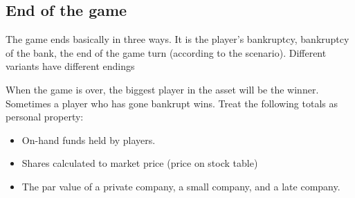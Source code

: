 \documentclass{article}
\begin{document}
\begin{CJK}{UTF8}{min}








\section{End of the game}

The game ends basically in three ways. It is the player's bankruptcy,
bankruptcy of the bank, the end of the game turn (according to the
scenario). Different variants have different endings

When the game is over, the biggest player in the asset will be the
winner. Sometimes a player who has gone bankrupt wins. Treat the
following totals as personal property:

\begin{itemize}
\item On-hand funds held by players.
\item Shares calculated to market price (price on stock table)
\item The par value of a private company, a small company, and a late company.
\end{itemize}


\end{CJK}
\end{document}
